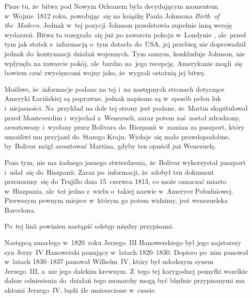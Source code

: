 \documentclass[a4paper,11pt]{article}
\begin{document}
\start {} Pisze tu, że~bitwa pod Nowym Orleanem była decydującym
momentem w~Wojnie~1812 roku, powołując~się na książkę Paula Johnsona
\emph{Birth~of the~Modern}. Jednak w~tej pozycji Johnson przedstawia
zupełnie inną wersję wydarzeń. Bitwa ta rozegrała~się już po zawarciu
pokoju w~Londynie , ale~przed tym jak statek
z~informacją o~tym dotarła do~USA, jej przebieg nie doprowadził jednak
do~kontynuacji działań wojennych. Tym samym, konkluduje Johnson, nie
wpłynęła na zawarcie pokój, ale~bardzo na~jego recepcję. Amerykanie
mogli~się bowiem czuć zwycięzcami wojny jako, że~wygrali ostatnią jej
bitwę.

\vspace{\spaceFour}


\start {} Możliwe, że~informacje podane na tej i~na następnych
stronach dotyczące Ameryki Łacińskiej są poprawne, jednak napisane są
w~sposób pełen luk i~niejasności. Na~przykład na dole tej strony jest
podane, że~Martin skapitulował przed Monteverdim i~wyjechał
z~Wenezueli, zaraz potem zaś~został zdradzony, aresztowany i~wysłany
przez Bolivara do~Hiszpanii w~zamian za paszport, który umożliwi mu
przyjazd do~Starego Kraju. Wydaje~się mało prawdopodobne, by~Bolivar
mógł aresztować Martina, gdyby ten opuścił już Wenezuelę.

Poza tym, nie ma żadnego jasnego stwierdzenia, że~Bolivar wykorzystał
paszport i~udał~się do~Hiszpanii. Zaraz po~informacji, że~zdobył ten
dokument przenosimy~się do Trujillo dnia 15~czerwca 1813, co może
oznaczać miasto w~Hiszpania, ale~też jedno z~wielu o~takiej nazwie
w~Ameryce Południowej. Pierwszym pewnym miejsce w~którym go potem
widzimy, jest wenezuelska Barcelona.

\vspace{\spaceFour}


\start {} Po~tej linii powinien nastąpić odstęp między
przypisami.

\vspace{\spaceFour}


\start {} Następcą zmarłego w~1820~roku Jerzego~III
Hanowerskiego był jego najstarszy syn Jerzy~IV Hanowerski panujący
w~latach 1820--1830. Dopiero po~nim panował w~latach 1830--1837
panował Wilhelm~IV, który był młodszym synem Jerzego~III, a~nie jego
dalekim krewnym. Z~tego tej karygodnej pomyłki wszelkie dalsze
odniesienia do~działań tego monarchy mogą być błędnie przypisanymi mu
aktami Jerzego~IV, bądź źle umieszczone w~czasie.

\vspace{\spaceFour}
\end{document}

